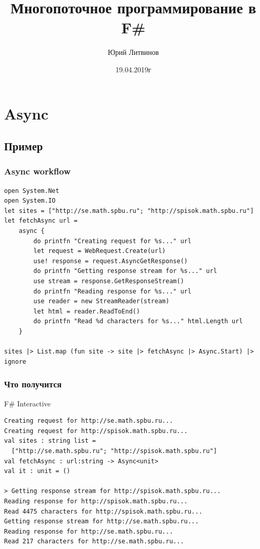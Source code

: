 \documentclass[xetex,mathserif,serif]{beamer}
\title{Многопоточное программирование в F\#}
\author{Юрий Литвинов}
\date{19.04.2019г}
\begin{document}
	
	\frame{\titlepage}

	\section{Async}

	\subsection{Пример}

	\begin{frame}[fragile]
		\frametitle{Async workflow}
		\begin{footnotesize}
			\begin{verbatim}
open System.Net
open System.IO
let sites = ["http://se.math.spbu.ru"; "http://spisok.math.spbu.ru"]
let fetchAsync url =
    async { 
        do printfn "Creating request for %s..." url
        let request = WebRequest.Create(url)
        use! response = request.AsyncGetResponse()
        do printfn "Getting response stream for %s..." url
        use stream = response.GetResponseStream()
        do printfn "Reading response for %s..." url
        use reader = new StreamReader(stream)
        let html = reader.ReadToEnd()
        do printfn "Read %d characters for %s..." html.Length url 
    }

sites |> List.map (fun site -> site |> fetchAsync |> Async.Start) |> ignore
			\end{verbatim}
		\end{footnotesize}
	\end{frame}

	\begin{frame}[fragile]
		\frametitle{Что получится}
		\begin{alertblock}{F\# Interactive}
			\begin{verbatim}
Creating request for http://se.math.spbu.ru...
Creating request for http://spisok.math.spbu.ru...
val sites : string list =
  ["http://se.math.spbu.ru"; "http://spisok.math.spbu.ru"]
val fetchAsync : url:string -> Async<unit>
val it : unit = ()

> Getting response stream for http://spisok.math.spbu.ru...
Reading response for http://spisok.math.spbu.ru...
Read 4475 characters for http://spisok.math.spbu.ru...
Getting response stream for http://se.math.spbu.ru...
Reading response for http://se.math.spbu.ru...
Read 217 characters for http://se.math.spbu.ru...
			\end{verbatim}
		\end{alertblock}
	\end{frame}
\end{document}
